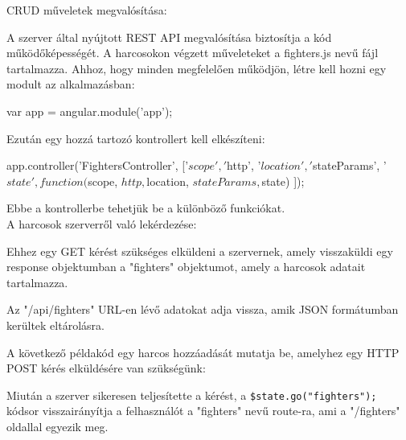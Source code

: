 
CRUD műveletek megvalósítása: 

A szerver által nyújtott REST API megvalósítása biztosítja a kód működőképességét. A harcosokon végzett műveleteket a fighters.js nevű fájl tartalmazza.
Ahhoz, hogy minden megfelelően működjön, létre kell hozni egy modult az alkalmazásban:

\begin{cpp}
var app = angular.module('app');
\end{cpp}

Ezután egy hozzá tartozó kontrollert kell elkészíteni:

\begin{cpp}
app.controller('FightersController', ['$scope', '$http', '$location', 
'$stateParams',  '$state', function($scope, $http, $location, 
$stateParams, $state){
}]);
\end{cpp}

Ebbe a kontrollerbe tehetjük be a különböző funkciókat. \\A harcosok szerverről való lekérdezése:


Ehhez egy GET kérést szükséges elküldeni a szervernek, amely visszaküldi egy response objektumban a "fighters" objektumot, amely a harcosok adatait tartalmazza.

Az "/api/fighters" URL-en lévő adatokat adja vissza, amik JSON formátumban kerültek eltárolásra.

A következő példakód egy harcos hozzáadását mutatja be, amelyhez egy HTTP POST kérés elküldésére van szükségünk:


Miután a szerver sikeresen teljesítette a kérést, a \texttt{\$state.go("fighters");} kódsor
visszairányítja a felhasználót a "fighters" nevű route-ra, ami a "/fighters" oldallal egyezik meg.

